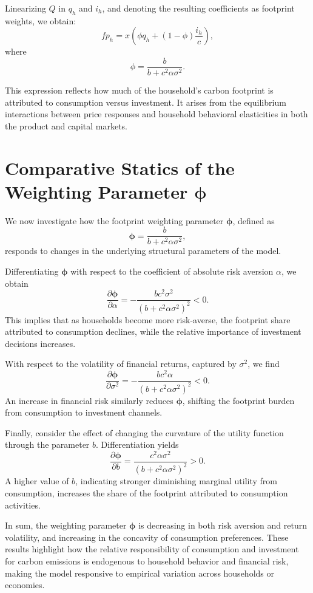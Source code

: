 \documentclass[12pt,a4paper]{article}%
\begin{document}
Linearizing \( Q \) in \( q_h \) and \( i_h \), and denoting the resulting coefficients as footprint weights, we obtain:
\[
fp_h = x \left( \phi q_h + (1 - \phi) \frac{i_h}{c} \right),
\]
where
\[
\phi = \frac{b}{b + c^2 \alpha \sigma^2}.
\]

This expression reflects how much of the household’s carbon footprint is attributed to consumption versus investment. It arises from the equilibrium interactions between price responses and household behavioral elasticities in both the product and capital markets.

\section{Comparative Statics of the Weighting Parameter \( \boldsymbol{\phi} \)}

We now investigate how the footprint weighting parameter \( \boldsymbol{\phi} \), defined as
\[
\boldsymbol{\phi} = \frac{b}{b + c^2 \alpha \sigma^2},
\]
responds to changes in the underlying structural parameters of the model.

Differentiating \( \boldsymbol{\phi} \) with respect to the coefficient of absolute risk aversion \( \alpha \), we obtain
\[
\frac{\partial \boldsymbol{\phi}}{\partial \alpha} = -\frac{b c^2 \sigma^2}{{(b + c^2 \alpha \sigma^2)}^2} < 0.
\]
This implies that as households become more risk-averse, the footprint share attributed to consumption declines, while the relative importance of investment decisions increases.

With respect to the volatility of financial returns, captured by \( \sigma^2 \), we find
\[
\frac{\partial \boldsymbol{\phi}}{\partial \sigma^2} = -\frac{b c^2 \alpha}{{(b + c^2 \alpha \sigma^2)}^2} < 0.
\]
An increase in financial risk similarly reduces \( \boldsymbol{\phi} \), shifting the footprint burden from consumption to investment channels.

Finally, consider the effect of changing the curvature of the utility function through the parameter \( b \). Differentiation yields
\[
\frac{\partial \boldsymbol{\phi}}{\partial b} = \frac{c^2 \alpha \sigma^2}{{(b + c^2 \alpha \sigma^2)}^2} > 0.
\]
A higher value of \( b \), indicating stronger diminishing marginal utility from consumption, increases the share of the footprint attributed to consumption activities.

In sum, the weighting parameter \( \boldsymbol{\phi} \) is decreasing in both risk aversion and return volatility, and increasing in the concavity of consumption preferences. These results highlight how the relative responsibility of consumption and investment for carbon emissions is endogenous to household behavior and financial risk, making the model responsive to empirical variation across households or economies.
\end{document}
